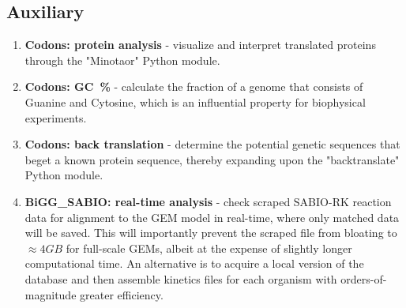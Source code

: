 \subsection{Auxiliary}
\begin{enumerate}
    \item \textbf{Codons: protein analysis} - visualize and interpret translated proteins through the "Minotaor" Python module.
    \item \textbf{Codons: GC~\%} - calculate the fraction of a genome that consists of Guanine and Cytosine, which is an influential property for biophysical experiments.
    \item \textbf{Codons: back translation} - determine the potential genetic sequences that beget a known protein sequence, thereby expanding upon the "backtranslate" Python module.
    \item \textbf{BiGG\_SABIO: real-time analysis} - check scraped SABIO-RK reaction data for alignment to the GEM model in real-time, where only matched data will be saved. This will importantly prevent the scraped file from bloating to $\approx 4 GB$ for full-scale GEMs, albeit at the expense of slightly longer computational time. An alternative is to acquire a local version of the database and then assemble kinetics files for each organism with orders-of-magnitude greater efficiency.
\end{enumerate}